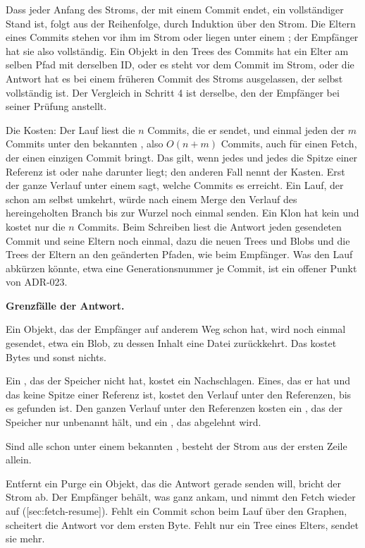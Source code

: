 Dass jeder Anfang des Stroms, der mit einem Commit endet, ein vollständiger Stand ist, folgt aus
der Reihenfolge, durch Induktion über den Strom.
Die Eltern eines Commits stehen vor ihm im Strom oder liegen unter einem ; der
Empfänger hat sie also vollständig.
Ein Objekt in den Trees des Commits hat ein Elter am selben Pfad mit derselben ID, oder es steht
vor dem Commit im Strom, oder die Antwort hat es bei einem früheren Commit des Stroms
ausgelassen, der selbst vollständig ist.
Der Vergleich in Schritt 4 ist derselbe, den der Empfänger bei seiner Prüfung anstellt.

Die Kosten: Der Lauf liest die $n$ Commits, die er sendet, und einmal jeden der $m$ Commits unter
den bekannten , also $O(n + m)$ Commits, auch für einen Fetch, der einen einzigen
Commit bringt.
Das gilt, wenn jedes  und jedes  die Spitze einer Referenz ist oder
nahe darunter liegt; den anderen Fall nennt der Kasten.
Erst der ganze Verlauf unter einem  sagt, welche Commits es erreicht.
Ein Lauf, der schon am  selbst umkehrt, würde nach einem Merge den Verlauf des
hereingeholten Branch bis zur Wurzel noch einmal senden.
Ein Klon hat kein  und kostet nur die $n$ Commits.
Beim Schreiben liest die Antwort jeden gesendeten Commit und seine Eltern noch einmal, dazu die
neuen Trees und Blobs und die Trees der Eltern an den geänderten Pfaden, wie beim Empfänger.
Was den Lauf abkürzen könnte, etwa eine Generationsnummer je Commit, ist ein offener Punkt von
ADR-023.

\startinfobox
{\bf Grenzfälle der Antwort.}
\startitemize
\item Ein Objekt, das der Empfänger auf anderem Weg schon hat, wird noch einmal gesendet, etwa
ein Blob, zu dessen Inhalt eine Datei zurückkehrt.
Das kostet Bytes und sonst nichts.
\item Ein , das der Speicher nicht hat, kostet ein Nachschlagen.
Eines, das er hat und das keine Spitze einer Referenz ist, kostet den Verlauf unter den
Referenzen, bis es gefunden ist.
Den ganzen Verlauf unter den Referenzen kosten ein , das der Speicher nur unbenannt
hält, und ein , das abgelehnt wird.
\item Sind alle  schon unter einem bekannten , besteht der Strom aus der
ersten Zeile allein.
\item Entfernt ein Purge ein Objekt, das die Antwort gerade senden will, bricht der Strom ab.
Der Empfänger behält, was ganz ankam, und nimmt den Fetch wieder auf
([sec:fetch-resume]).
Fehlt ein Commit schon beim Lauf über den Graphen, scheitert die Antwort vor dem ersten Byte.
Fehlt nur ein Tree eines Elters, sendet sie mehr.
\stopitemize
\stopinfobox

